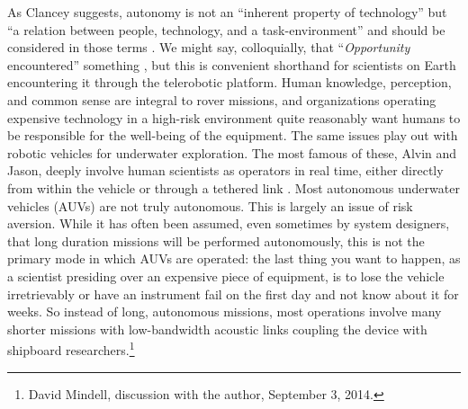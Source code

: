 As Clancey suggests, autonomy is not an ``inherent property of
technology'' but ``a relation between people, technology, and a
task-environment'' and should be considered in those terms \cite[p.
  119]{clancey}. We might say, colloquially, that 
``\emph{Opportunity} encountered'' something \cite[p. 8]{clancey}, but
this is convenient shorthand for scientists on Earth encountering it
through the telerobotic platform. Human knowledge,
perception, and common sense are integral to rover missions, and
organizations operating expensive 
technology in a high-risk environment quite reasonably want humans to
be responsible
for the well-being of the equipment. The same issues play out with
robotic vehicles for underwater exploration. The most famous of these,
Alvin and Jason, deeply involve human scientists as operators in real
time, either directly from within the vehicle or through a tethered
link \cite{NOAA1} \cite{NOAA2}. Most autonomous underwater
vehicles (AUVs) are not 
truly autonomous. This is largely an issue of risk
aversion. While it has often been assumed, even sometimes by system
designers, that long duration missions will be performed autonomously,
this is not the primary mode in which AUVs are operated: the last
thing you want to happen, as a scientist presiding over an expensive
piece of equipment, is to lose the vehicle irretrievably or have an
instrument fail on the first day and not know about it for weeks. So
instead of long, autonomous missions, most operations involve many
shorter missions with low-bandwidth acoustic links coupling the device with
shipboard researchers.\footnote{David Mindell, discussion with the
  author, September 3, 2014.} 






